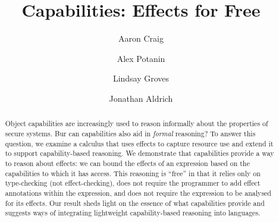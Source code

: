 \documentclass[runningheads]{llncs}
\begin{document}
\title{Capabilities: Effects for Free}

\author{Aaron Craig \and
  Alex Potanin \and
  Lindsay Groves \and
  Jonathan Aldrich}



\maketitle

\begin{abstract}
  Object capabilities are increasingly used to reason informally about
  the properties of secure systems. Bur can capabilities also aid in
  \textit{formal} reasoning? To answer this question, we examine a
  calculus that uses effects to capture resource use and extend it to
  support capability-based
  reasoning. We demonstrate that capabilities provide a way to reason
  about effects: we can bound the effects of an expression
  based on the capabilities to which it has access.  This reasoning is
  ``free'' in that it relies only on type-checking (not
  effect-checking), does not require the programmer to add effect
  annotations within the expression, and does not require the
  expression to be analysed for its effects. Our result sheds light on
  the essence of what capabilities provide and suggests ways of
  integrating lightweight capability-based reasoning into languages.

\end{abstract}







\end{document}
